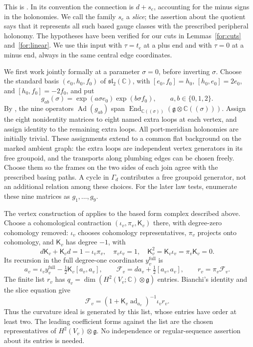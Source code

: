 This is \cite[Proposition~4.5, with the based-gauge identification of
Lemma~4.4]{MT}.  In its convention the connection is $d+s_e$, accounting
for the minus signs in the holonomies.  We call the family $s_e$ a
\emph{slice}; the assertion about the quotient says that it represents
all such based gauge classes with the prescribed peripheral holonomy.
The hypotheses have been verified for our
cuts in Lemmas~\ref{for:cuts} and~\ref{for:linear}.  We use this input
with $\tau=t_e$ at a plus end and with $\tau=0$ at a minus end, always
in the same central edge coordinates.

We first work jointly formally at a parameter $\sigma=0$, before
inverting $\sigma$.  Choose the standard basis
$(e_0,h_0,f_0)$ of $\mathfrak{sl}_2(\mathbb C)$, with
$[e_0,f_0]=h_0$, $[h_0,e_0]=2e_0$, and $[h_0,f_0]=-2f_0$, and put
\[
 g_{ab}(\sigma)=\exp(a\sigma e_0)\exp(b\sigma f_0),
                  \qquad a,b\in\{0,1,2\}.
\]
By \cite[Lemma~6.5]{MT}, the nine operators
$\operatorname{Ad}(g_{ab})$ span
$\operatorname{End}_{\mathbb C((\sigma))}(\mathfrak g\otimes
\mathbb C((\sigma)))$.  Assign the eight nonidentity matrices to
eight named extra loops at each vertex, and assign identity to the
remaining extra loops.  All port-meridian holonomies are initially
trivial.  These assignments extend to a common flat background on
the marked ambient graph: the extra loops are independent vertex
generators in its free groupoid, and the transports along plumbing
edges can be chosen freely.  Choose them so the frames on the two
sides of each join agree with the prescribed basing paths.  A cycle
in $\Gamma_d$ contributes a free groupoid generator, not an additional
relation among these choices.
For the later law tests, enumerate these nine matrices as
$g_1,\ldots,g_9$.

The vertex construction of \cite[Section~6.2]{MT} applies to the
based form complex described above.  Choose a cohomological
contraction $(\iota_v,\pi_v,\mathsf K_v)$ there, with degree-zero
cohomology removed: $\iota_v$ chooses cohomology representatives,
$\pi_v$ projects onto cohomology, and $\mathsf K_v$ has degree $-1$,
with
\[
 d\mathsf K_v+\mathsf K_vd=1-\iota_v\pi_v,
 \quad \pi_v\iota_v=1,
 \quad \mathsf K_v^2=\mathsf K_v\iota_v=\pi_v\mathsf K_v=0.
\]
Its recursion in the full degree-one coordinates
$y_v^{\mathrm{full}}$ is
\[
 a_v=\iota_vy_v^{\mathrm{full}}
             -\tfrac12\mathsf K_v[a_v,a_v],\qquad
 \mathcal F_v=da_v+\tfrac12[a_v,a_v],\qquad
 r_v=\pi_v\mathcal F_v.
\]
The finite list $r_v$ has
$q_v=\dim(H^2(V_v;\mathbb C)\otimes\mathfrak g)$ entries.  Bianchi's
identity and the slice equation give
\begin{equation}
\label{for:curvature-list}
 \mathcal F_v=(1+\mathsf K_v\operatorname{ad}_{a_v})^{-1}\iota_v r_v.
\end{equation}
Thus the curvature ideal is generated by this list, whose entries have
order at least two.  The leading coefficient forms against the list
are the chosen representatives of $H^2(V_v)\otimes\mathfrak g$.
No independence or regular-sequence assertion about its entries is
needed.

